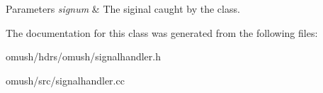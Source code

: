 \begin{DoxyParams}{Parameters}
{\em signum} & The siginal caught by the class. \\
\hline
\end{DoxyParams}


The documentation for this class was generated from the following files\-:\begin{DoxyCompactItemize}
\item 
omush/hdrs/omush/signalhandler.\-h\item 
omush/src/signalhandler.\-cc\end{DoxyCompactItemize}
